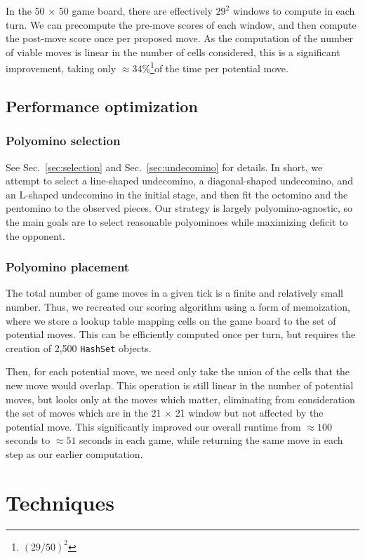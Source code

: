 \documentclass{scrartcl}
\begin{document}
In the 50 $\times$ 50 game board, there are effectively $29^2$ windows to compute in each turn. We can precompute the pre-move scores of each window, and then compute the post-move score once per proposed move. As the computation of the number of viable moves is linear in the number of cells considered, this is a significant improvement, taking only $\approx 34$\%\footnote{$(29/50)^2$}of the time per potential move.

\subsection{Performance optimization}
\subsubsection{Polyomino selection}
See Sec.~\ref{sec:selection} and Sec.~\ref{sec:undecomino} for details. In short, we attempt to select a line-shaped undecomino, a diagonal-shaped undecomino, and an L-shaped undecomino in the initial stage, and then fit the octomino and the pentomino to the observed pieces. Our strategy is largely polyomino-agnostic, so the main goals are to select reasonable polyominoes while maximizing deficit to the opponent.

\subsubsection{Polyomino placement}
The total number of game moves in a given tick is a finite and relatively small number. Thus, we recreated our scoring algorithm using a form of memoization, where we store a lookup table mapping cells on the game board to the set of potential moves. This can be efficiently computed once per turn, but requires the creation of 2,500 \texttt{HashSet} objects.

Then, for each potential move, we need only take the union of the cells that the new move would overlap. This operation is still linear in the number of potential moves, but looks only at the moves which matter, eliminating from consideration the set of moves which are in the 21 $\times$ 21 window but not affected by the potential move. This significantly improved our overall runtime from $\approx 100$ seconds to $\approx 51$ seconds in each game, while returning the same move in each step as our earlier computation.


\section{Techniques}\label{sec:techniques}
\end{document}
